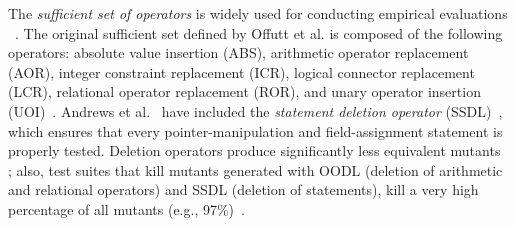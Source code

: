 The  \emph{sufficient set of operators} is widely used for conducting empirical evaluations ~\cite{offutt1996experimental,rothermel1996experimental,andrews2005mutation,kintis2017detecting}. 
The original sufficient set defined by Offutt et al. is composed of the following operators: absolute value insertion (ABS), arithmetic operator replacement (AOR), integer constraint replacement (ICR), logical connector replacement (LCR), relational operator replacement (ROR), and unary operator insertion (UOI)~\cite{offutt1996experimental}.
Andrews et al.~\cite{andrews2005mutation} have included the 
\emph{statement deletion operator} (SSDL)~\cite{delamaro2014designing}, which ensures that every pointer-manipulation and field-assignment statement is properly tested. 
Deletion operators produce significantly less equivalent mutants~
\cite{delamaro2014designing,delamaro2014experimental}; also, 
test suites that kill mutants generated with OODL (deletion of arithmetic and relational operators) and SSDL (deletion of statements), kill a very high percentage of all mutants (e.g., 97\%)~\cite{delamaro2014experimental}. 

%
%




